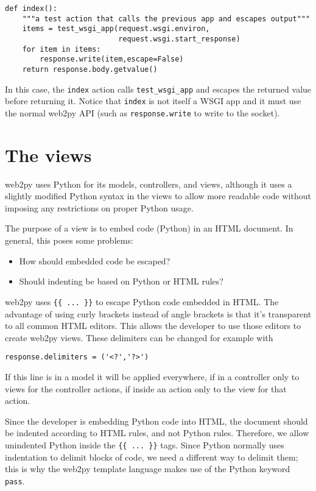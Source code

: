\documentclass[justified,sixbynine,notoc]{tufte-book}
\def\ft{\small\tt}
\def\inxx#1{\index{#1}}
\begin{document}
\begin{fullwidth}
\begin{lstlisting}
def index():
    """a test action that calls the previous app and escapes output"""
    items = test_wsgi_app(request.wsgi.environ,
                          request.wsgi.start_response)
    for item in items:
        response.write(item,escape=False)
    return response.body.getvalue()
\end{lstlisting}

In this case, the {\ft index} action calls {\ft test\_wsgi\_app} and escapes the returned value before returning it. Notice that {\ft index} is not itself a WSGI app and it must use the normal web2py API (such as {\ft response.write} to write to the socket).

\goodbreak\chapter{The views}

\inxx{views} \inxx{template language} \inxx{HTML}
\noindent web2py uses Python for its models, controllers, and views, although it uses a slightly modified Python syntax in the views to allow more readable code without imposing any restrictions on proper Python usage.

The purpose of a view is to embed code (Python) in an HTML document. In general, this poses some problems:
\begin{itemize}
\item How should embedded code be escaped?

\item Should indenting be based on Python or HTML rules?
\end{itemize}
\noindent web2py uses {\ft \{\{ ... \}\}} to escape Python code embedded in HTML. The advantage of using curly brackets instead of angle brackets is that it's transparent to all common HTML editors. This allows the developer to use those editors to create web2py views. These delimiters can be changed for example with

\begin{lstlisting}
response.delimiters = ('<?','?>')
\end{lstlisting}

If this line is in a model it will be applied everywhere, if in a controller only to views for the controller actions, if inside an action only to the view for that action.

Since the developer is embedding Python code into HTML, the document should be indented according to HTML rules, and not Python rules. Therefore, we allow unindented Python inside the {\ft \{\{ ... \}\}} tags. Since Python normally uses indentation to delimit blocks of code, we need a different way to delimit them; this is why the web2py template language makes use of the Python keyword {\ft pass}.


\end{fullwidth}
\end{document}
